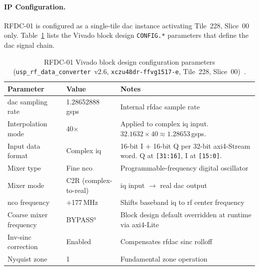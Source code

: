 
\FloatBarrier
\paragraph{IP Configuration.}

RFDC-01 is configured as a single-tile \ac{dac} instance activating
Tile~228, Slice~00 only.
Table~\ref{tab:rfdc01_ip_config} lists the Vivado block design
\texttt{CONFIG.*} parameters that define the \ac{dac} signal chain.

\begin{table}[htbp]
  \caption{RFDC-01 Vivado block design configuration parameters
           (\texttt{usp\_rf\_data\_converter}~v2.6,
           \texttt{xczu48dr\allowbreak-ffvg1517\allowbreak-e},
           Tile~228, Slice~00)~\cite{AMD_PG269}.}
  \label{tab:rfdc01_ip_config}
  \centering
  \small
  \begin{tabular}{p{4.5cm}p{4.0cm}p{6.5cm}}
    \hline
    Parameter & Value & Notes \\
    \hline
    \ac{dac} sampling rate
      & 1.28652888\,\ac{gsps}
      & Internal \ac{rfdac} sample rate \\[3pt]
    Interpolation mode
      & 40$\times$
      & Applied to complex \ac{iq} input.
        $32.1632 \times 40 \approx 1.28653$\,\ac{gsps}. \\[3pt]
    Input data format
      & Complex \ac{iq}
      & 16-bit I $+$ 16-bit Q per 32-bit \ac{axi}4-Stream word.
        Q at \texttt{[31:16]}, I at \texttt{[15:0]}. \\[3pt]
    Mixer type
      & Fine \ac{nco}
      & Programmable-frequency digital oscillator \\[3pt]
    Mixer mode
      & C2R (complex-to-real)
      & \ac{iq} input $\to$ real \ac{dac} output \\[3pt]
    \ac{nco} frequency
      & $+$177\,MHz
      & Shifts baseband \ac{iq} to \ac{rf} center frequency \\[3pt]
    Coarse mixer frequency
      & BYPASS$^{a}$
      & Block design default overridden at runtime
        via \ac{axi}4-Lite \\[3pt]
    Inv-sinc correction
      & Enabled
      & Compensates \ac{rfdac} sinc rolloff \\[3pt]
    Nyquist zone
      & 1
      & Fundamental zone operation \\[3pt]

\end{tabular}
\end{table}
